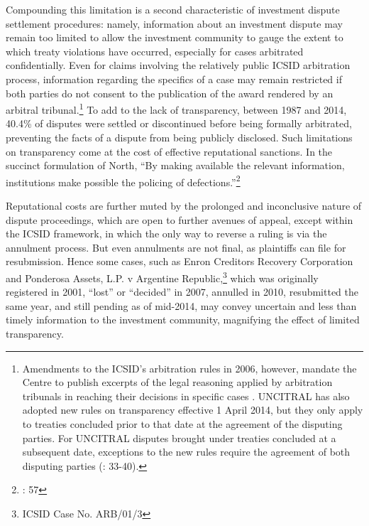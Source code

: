 \documentclass[12pt,onesided]{amsart}
\begin{document}
Compounding this limitation is a second characteristic of investment dispute settlement procedures: namely, information about an investment dispute may remain too limited to allow the investment community to gauge the extent to which treaty violations have occurred, especially for cases arbitrated confidentially. Even for claims involving the relatively public ICSID arbitration process, information regarding the specifics of a case may remain restricted if both parties do not consent to the publication of the award rendered by an arbitral tribunal.\footnote{Amendments to the ICSID's arbitration rules in 2006, however, mandate the Centre to publish excerpts of the legal reasoning applied by arbitration tribunals in reaching their decisions in specific cases \citep{antonietti:2006}. UNCITRAL has also adopted new rules on transparency effective 1 April 2014, but they only apply to treaties concluded prior to that date at the agreement of the disputing parties. For UNCITRAL disputes brought under treaties concluded at a subsequent date, exceptions to the new rules require the agreement of both disputing parties (\citealp{uncitral:2013}: 33-40).} To add to the lack of transparency, between 1987 and 2014, 40.4\% of disputes were settled or discontinued before being formally arbitrated, preventing the facts of a dispute from being publicly disclosed. Such limitations on transparency come at the cost of effective reputational sanctions. In the succinct formulation of North, ``By making available the relevant information, institutions make possible the policing of defections.''\footnote{\citet{north1990institutions}: 57} 

Reputational costs are further muted by the prolonged and inconclusive nature of dispute proceedings, which are open to further avenues of appeal, except within the ICSID framework, in which the only way to reverse a ruling is via the annulment process. But even annulments are not final, as plaintiffs can file for resubmission. Hence some cases, such as Enron Creditors Recovery Corporation and Ponderosa Assets, L.P. v Argentine Republic,\footnote{ICSID Case No. ARB/01/3} which was originally registered in 2001, ``lost'' or ``decided'' in 2007, annulled in 2010, resubmitted the same year, and still pending as of mid-2014, may convey uncertain and less than timely information to the investment community, magnifying the effect of limited transparency. 
\end{document}
